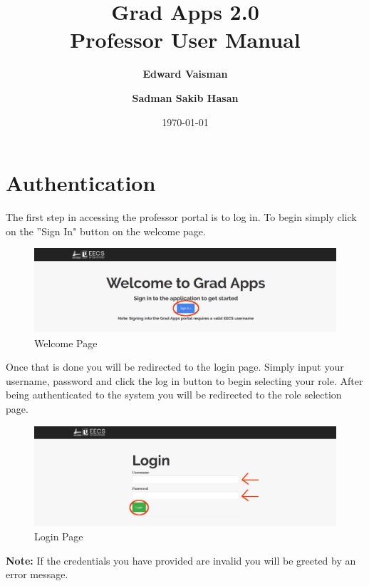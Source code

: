 \documentclass[fontsize=12pt,paper=letter,twoside]{scrartcl}
\author{\textbf{Edward Vaisman}
\and \textbf{Sadman Sakib Hasan}
}
\date{\today} %
\begin{document}
\title{Grad Apps 2.0 \\ Professor User Manual}
\maketitle

\newpage

\tableofcontents

\newpage



\clearpage
\section{Authentication}

The first step in accessing the professor portal is to log in. To begin simply click on the ''Sign In" button on the welcome page.

\begin{figure}[!htb]
\begin{center}
\includegraphics[width=.99\textwidth]{images/welcome.png}
\end{center}
\caption{Welcome Page}
\label{fig:welcome}
\end{figure}

\bigskip

Once that is done you will be redirected to the login page. Simply input your username, password and click the log in button to begin selecting your role. After being authenticated to the system you will be redirected to the role selection page.

\begin{figure}[!htb]
\begin{center}
\includegraphics[width=.99\textwidth]{images/login.png}
\end{center}
\caption{Login Page}
\label{fig:login}
\end{figure}
\noindent \textbf{Note:} If the credentials you have provided are invalid you will be greeted by an error message.
\end{document}
